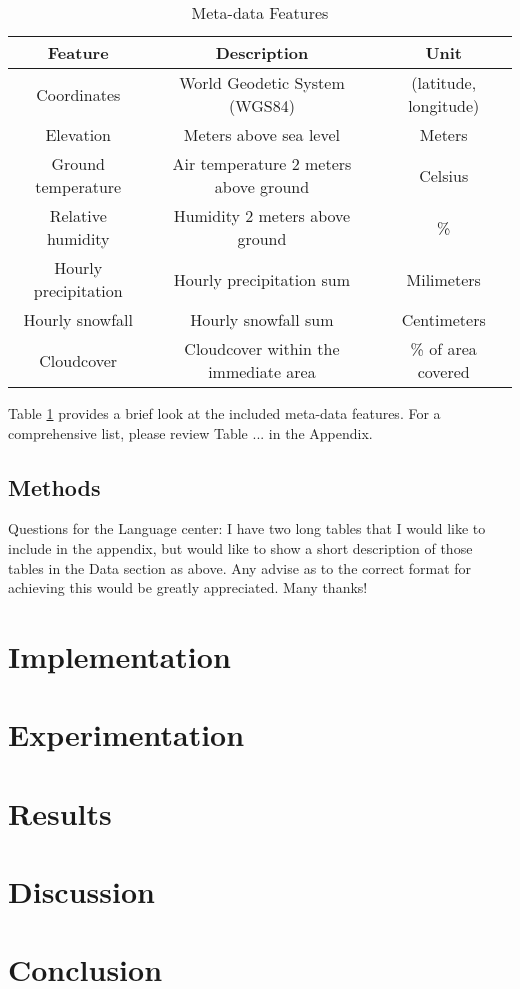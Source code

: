 \documentclass[conference]{IEEEtran}
\begin{document}
        \begin{table}[htbp]
        \caption{Meta-data Features}
        \begin{center}
        \begin{tabular}{|c|c|c|}
        \hline
        Feature & Description & Unit \\
        \hline
        Coordinates & World Geodetic System (WGS84) & (latitude, longitude) \\
        Elevation & Meters above sea level & Meters \\
        Ground temperature & Air temperature 2 meters above ground & Celsius \\
        Relative humidity & Humidity 2 meters above ground & \% \\
        Hourly precipitation & Hourly precipitation sum & Milimeters \\
        Hourly snowfall & Hourly snowfall sum & Centimeters \\
        Cloudcover & Cloudcover within the immediate area & \% of area covered \\
        \hline
        \end{tabular}
        \label{table: open_meteo_summary}
        \end{center}
        \end{table}

        Table \ref{table: open_meteo_summary} provides a brief look at the included meta-data features. For a comprehensive list, please review Table ... in the Appendix.
    
    \subsection{Methods}
    Questions for the Language center:
    I have two long tables that I would like to include in the appendix, but would like to show a short description of those tables in the Data section as above. Any advise as to the correct format for achieving this would be greatly appreciated. Many thanks!

\section{Implementation}

\section{Experimentation}

\section{Results}

\section{Discussion}

\section{Conclusion}




\end{document}
